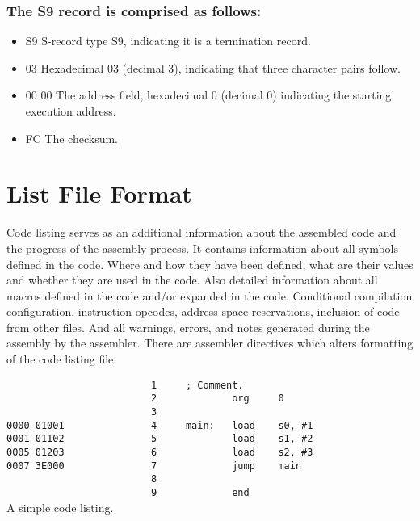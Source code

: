     \subsubsection{The S9 record is comprised as follows:}
        \begin{itemize}
            \item S9 S-record type S9, indicating it is a termination record.
            \item 03 Hexadecimal 03 (decimal 3), indicating that three character pairs follow.
            \item 00 00 The address field, hexadecimal 0 (decimal 0) indicating the starting execution address.
            \item FC The checksum.
        \end{itemize}

\clearpage
\section{List File Format}
    Code listing serves as an additional information about the assembled code and the progress of the assembly process. It contains information about all symbols defined in the code. Where and how they have been defined, what are their values and whether they are used in the code. Also detailed information about all macros defined in the code and/or expanded in the code. Conditional compilation configuration, instruction opcodes, address space reservations, inclusion of code from other files. And all warnings, errors, and notes generated during the assembly by the assembler. There are assembler directives which alters formatting of the code listing file.

    \begin{code}[h]
        \verb'                         1     ; Comment.'\\
        \verb'                         2             org     0'\\
        \verb'                         3'\\
        \verb'0000 01001               4     main:   load    s0, #1'\\
        \verb'0001 01102               5             load    s1, #2'\\
        \verb'0005 01203               6             load    s2, #3'\\
        \verb'0007 3E000               7             jump    main'\\
        \verb'                         8'\\
        \verb'                         9             end'\\
        \caption{A simple code listing.}
    \end{code}

